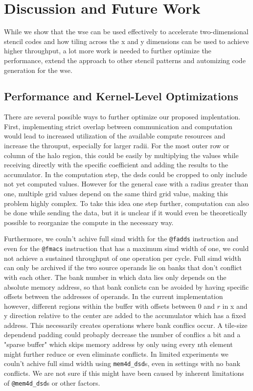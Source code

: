 \chapter{Discussion and Future Work}
While we show that the \ac{wse} can be used effectively to accelerate two-dimensional stencil codes and how tiling across the x and y dimensions can be used to achieve higher throughput, a lot more work is needed to further optimize the performance, extend the approach to other stencil patterns and automizing code generation for the \ac{wse}.

\section{Performance and Kernel-Level Optimizations}
There are several possible ways to further optimize our proposed implentation.
First, implementing strict overlap between communication and computation would lead to increased utilization of the available compute resources and increase the throuput, especially for larger radii.
For the most outer row or column of the halo region, this could be easily by multiplying the values while receiving directly with the specific coefficient and adding the results to the accumulator. In the computation step, the \acp{dsd} could be cropped to only include not yet computed values. However for the general case with a radius greater than one, multiple grid values depend on the same third grid value, making this problem highly complex. To take this idea one step further, computation can also be done while sending the data, but it is unclear if it would even be theoretically possible to reorganize the compute in the necessary way.

Furthermore, we couln't achive full \ac{simd} width for the \texttt{@fadds} instruction and even for the \texttt{@fmacs} instruction that has a maximum \ac{simd} width of one, we could not achieve a sustained throughput of one operation per cycle. Full \ac{simd} width can only be archived if the two source operands lie on banks that don't conflict with each other. The bank number in which data lies only depends on the absolute memory address, so that bank conlicts can be avoided by having specific offsets between the addresses of operands. In the current implementation however, different regions within the buffer with offsets between 0 and $r$ in x and y direction relative to the center are added to the accumulator which has a fixed address. This necessarily creates operations where bank conflics occur. A tile-size dependend padding could probaply decrease the number of conflics a bit and a "sparse buffer" which skips memory address by only using every nth element might further reduce or even eliminate conflicts. In limited experiments we couln't achive full \ac{simd} width using \texttt{mem4d\_dsd}s, even in settings with no bank conflicts. We are not sure if this might have been caused by inherent limitations of \texttt{@mem4d\_dsd}s or other factors.

